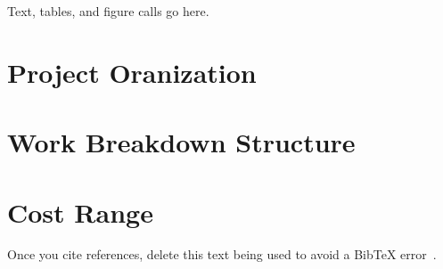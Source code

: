 
Text, tables, and figure calls go here.


\section{Project Oranization}
\label{proj_org}


\section{Work Breakdown Structure}
\label{wbs}


\section{Cost Range}
\label{cost}


\label{mstones_sched}

 
Once you cite references, delete this text being used
to avoid a BibTeX error~\cite{Adare:2010ux}.
